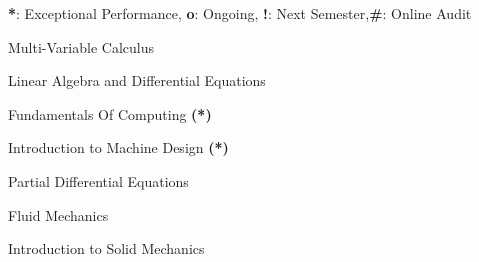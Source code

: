 
\begin{cventries}

  \cventry
    {\textbf{*}: Exceptional Performance,  \textbf{o}: Ongoing,   \textbf{!}: Next Semester,\textbf{\#}: Online Audit}{}{}{}{\begin{cvitems}
        \item {Multi-Variable Calculus}
        \item {Linear Algebra and Differential Equations}
        \item {Fundamentals Of Computing \textbf{(*)}}
        \item {Introduction to Machine Design \textbf{(*)}} 
        \item {Partial Differential Equations}
        \item {Fluid Mechanics}
        \item {Introduction to Solid Mechanics}
      \end{cvitems}
      }
  \end{cventries}
